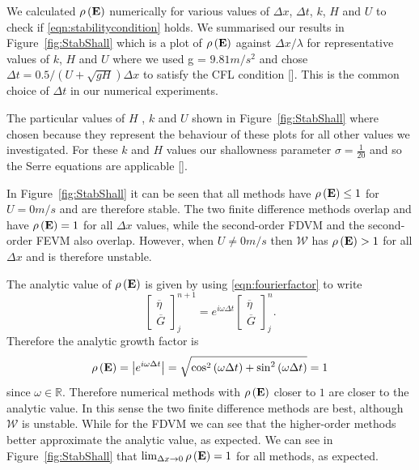 We calculated $\rho\left(\mathbf{E} \right)$ numerically for various values of $\Delta x$, $\Delta t$, $k$, $H$ and $U$ to check if \eqref{eqn:stabilitycondition} holds. We summarised our results in Figure~\ref{fig:StabShall} which is a plot of $\rho\left(\mathbf{E}\right)$ against $\Delta x / \lambda$ for representative values of $k$, $H$ and $U$ where we used g = $9.81m/s^2$ and chose $\Delta t = 0.5 / \left(U + \sqrt{gH}\right) \Delta x$ to satisfy the CFL condition []. This is the common choice of $\Delta t$ in our numerical experiments.

The particular values of $H$ , $k$ and $U$ shown in Figure~\ref{fig:StabShall} where chosen because they represent the behaviour of these plots for all other values we investigated. For these $k$ and $H$ values our shallowness parameter $\sigma = \frac{1}{20}$ and so the Serre equations are applicable []. 

In Figure~\ref{fig:StabShall} it can be seen that all methods have $\rho\left(\mathbf{E} \right) \le 1$ for $U=0m/s$ and are therefore stable. The two finite difference methods overlap and have $\rho\left(\mathbf{E} \right) = 1$ for all $\Delta x$ values, while the second-order FDVM and the second-order FEVM also overlap. However, when $U \neq 0m/s$ then $\mathcal{W}$ has $\rho\left(\mathbf{E} \right) > 1$ for all $\Delta x$ and is therefore unstable. 

The analytic value of $\rho\left(\mathbf{E}\right)$ is given by using \eqref{eqn:fourierfactor} to write
\begin{equation*}
\begin{bmatrix}
\overline{\eta} \\ \overline{G}
\end{bmatrix}^{n+1}_j = e^{i \omega \Delta t}\begin{bmatrix}
\overline{\eta} \\ \overline{G}
\end{bmatrix}^{n}_j.
\end{equation*}
Therefore the analytic growth factor is
\begin{align}
\rho\left(\mathbf{E}\right) = \left| e^{i \omega \Delta t} \right| = \sqrt{\cos^2 \left(\omega \Delta t\right) + \sin^2 \left(\omega \Delta t\right)}  = 1
\end{align}
since $\omega \in \mathbb{R}$. Therefore numerical methods with $\rho\left(\mathbf{E}\right)$ closer to $1$ are closer to the analytic value. In this sense the two finite difference methods are best, although $\mathcal{W}$ is unstable. While for the FDVM we can see that the higher-order methods better approximate the analytic value, as expected. We can see in Figure~\ref{fig:StabShall} that $\lim_{\Delta x \rightarrow 0}\rho\left(\mathbf{E}\right) = 1$ for all methods, as expected.


